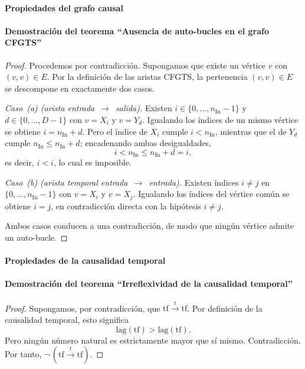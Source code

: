 \documentclass[12pt]{report} %
\begin{document}
\paragraph*{Propiedades del grafo causal}

\paragraph*{Demostración del teorema ``Ausencia de auto-bucles en el grafo CFGTS''}
\begin{proof}
    Procedemos por contradicción. Supongamos que existe un vértice $v$ con $(v, v) \in E$. Por la definición de las aristas CFGTS, la pertenencia $(v,v) \in E$ se descompone en exactamente dos casos.

    \textit{Caso~(a) (arista entrada~$\to$~salida).} Existen $i \in \{0, \ldots, n_{\text{In}}-1\}$ y $d \in \{0, \ldots, D-1\}$ con $v = X_i$ y $v = Y_d$. Igualando los índices de un mismo vértice se obtiene $i = n_{\text{In}} + d$. Pero el índice de $X_i$ cumple $i < n_{\text{In}}$, mientras que el de $Y_d$ cumple $n_{\text{In}} \leq n_{\text{In}} + d$; encadenando ambas desigualdades,
    $$i < n_{\text{In}} \leq n_{\text{In}} + d = i,$$
    es decir, $i < i$, lo cual es imposible.

    \textit{Caso~(b) (arista temporal entrada~$\to$~entrada).} Existen índices $i \neq j$ en $\{0, \ldots, n_{\text{In}}-1\}$ con $v = X_i$ y $v = X_j$. Igualando los índices del vértice común se obtiene $i = j$, en contradicción directa con la hipótesis $i \neq j$.

    Ambos casos conducen a una contradicción, de modo que ningún vértice admite un auto-bucle.
\end{proof}

\paragraph*{Propiedades de la causalidad temporal}

\paragraph*{Demostración del teorema ``Irreflexividad de la causalidad temporal''}
\begin{proof}
    Supongamos, por contradicción, que $\mathrm{tf} \xrightarrow{t} \mathrm{tf}$. Por definición de la causalidad temporal, esto significa
    $$\mathrm{lag}(\mathrm{tf}) > \mathrm{lag}(\mathrm{tf}).$$
    Pero ningún número natural es estrictamente mayor que sí mismo. Contradicción. Por tanto, $\neg\,(\mathrm{tf} \xrightarrow{t} \mathrm{tf})$.
\end{proof}
\end{document}
